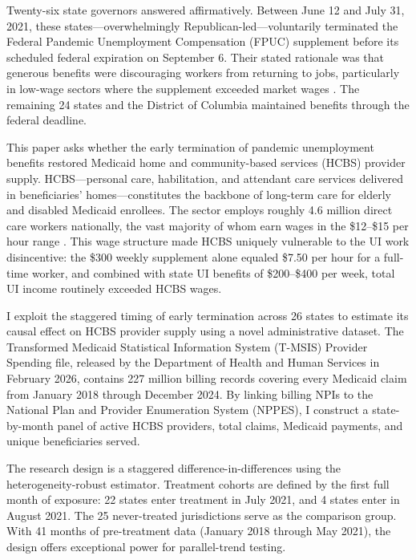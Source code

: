 \documentclass[12pt]{article}
\begin{document}
Twenty-six state governors answered affirmatively. Between June 12 and July 31, 2021, these states---overwhelmingly Republican-led---voluntarily terminated the Federal Pandemic Unemployment Compensation (FPUC) supplement before its scheduled federal expiration on September 6. Their stated rationale was that generous benefits were discouraging workers from returning to jobs, particularly in low-wage sectors where the supplement exceeded market wages \citep{holzer2021}. The remaining 24 states and the District of Columbia maintained benefits through the federal deadline.

This paper asks whether the early termination of pandemic unemployment benefits restored Medicaid home and community-based services (HCBS) provider supply. HCBS---personal care, habilitation, and attendant care services delivered in beneficiaries' homes---constitutes the backbone of long-term care for elderly and disabled Medicaid enrollees. The sector employs roughly 4.6 million direct care workers nationally, the vast majority of whom earn wages in the \$12--\$15 per hour range \citep{phi2021}. This wage structure made HCBS uniquely vulnerable to the UI work disincentive: the \$300 weekly supplement alone equaled \$7.50 per hour for a full-time worker, and combined with state UI benefits of \$200--\$400 per week, total UI income routinely exceeded HCBS wages.

I exploit the staggered timing of early termination across 26 states to estimate its causal effect on HCBS provider supply using a novel administrative dataset. The Transformed Medicaid Statistical Information System (T-MSIS) Provider Spending file, released by the Department of Health and Human Services in February 2026, contains 227 million billing records covering every Medicaid claim from January 2018 through December 2024. By linking billing NPIs to the National Plan and Provider Enumeration System (NPPES), I construct a state-by-month panel of active HCBS providers, total claims, Medicaid payments, and unique beneficiaries served.

The research design is a staggered difference-in-differences using the \citet{callaway2021} heterogeneity-robust estimator. Treatment cohorts are defined by the first full month of exposure: 22 states enter treatment in July 2021, and 4 states enter in August 2021. The 25 never-treated jurisdictions serve as the comparison group. With 41 months of pre-treatment data (January 2018 through May 2021), the design offers exceptional power for parallel-trend testing.
\end{document}
